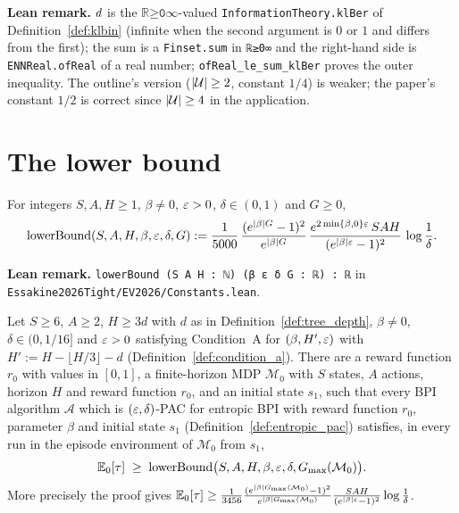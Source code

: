 \textbf{Lean remark.} $d$ is the $\texttt{ℝ≥0∞}$-valued \texttt{InformationTheory.klBer} of
Definition~\ref{def:klbin} (infinite when the second argument is $0$ or $1$ and differs from the
first); the sum is a \texttt{Finset.sum} in \texttt{ℝ≥0∞} and the
right-hand side is \texttt{ENNReal.ofReal} of a real number; \texttt{ofReal\_le\_sum\_klBer} proves
the outer inequality. The outline's version
($\lvert \mathcal U \rvert \ge 2$, constant $1/4$) is weaker; the paper's constant $1/2$ is correct
since $\lvert \mathcal U \rvert \ge 4$ in the application.

\section{The lower bound}
\label{sec:lb_theorem}

\begin{definition}\label{def:lower_bound_const}
\leanok
{}
For integers $S, A, H \ge 1$, $\beta \ne 0$, $\varepsilon > 0$, $\delta \in (0,1)$ and $G \ge 0$,
\[
  \mathrm{lowerBound}(S, A, H, \beta, \varepsilon, \delta, G) := \frac{1}{5000}\,\frac{(e^{|\beta| G} - 1)^2}{e^{|\beta| G}}\,
  \frac{e^{2\min\{\beta, 0\}\varepsilon}\, S A H}{(e^{|\beta|\varepsilon} - 1)^2}\,\log\frac1\delta .
\]
\end{definition}

\textbf{Lean remark.} \texttt{lowerBound (S A H : ℕ) (β ε δ G : ℝ) : ℝ} in
\texttt{Essakine2026Tight/EV2026/Constants.lean}.

\begin{theorem}\label{thm:lower_bound}
\leanok
{}
Let $S \ge 6$, $A \ge 2$, $H \ge 3d$ with $d$ as in Definition~\ref{def:tree_depth}, $\beta \ne 0$,
$\delta \in (0, 1/16]$ and $\varepsilon > 0$ satisfying Condition~A for $(\beta, H', \varepsilon)$ with
$H' := H - \lfloor H/3 \rfloor - d$ (Definition~\ref{def:condition_a}). There are a reward
function $r_0$ with values in $[0,1]$, a finite-horizon MDP $\mathcal M_0$ with $S$ states, $A$
actions, horizon $H$ and reward function $r_0$, and an initial state $s_1$, such that every BPI
algorithm $\mathcal A$ which is $(\varepsilon,\delta)$-PAC for entropic BPI with reward function $r_0$,
parameter $\beta$ and initial state $s_1$ (Definition~\ref{def:entropic_pac}) satisfies, in every
run in the episode environment of $\mathcal M_0$ from $s_1$,
\[
  \mathbb{E}_0[\tau] \;\ge\; \mathrm{lowerBound}\big(S, A, H, \beta, \varepsilon, \delta, G_{\max}(\mathcal M_0)\big) .
\]
More precisely the proof gives $\mathbb{E}_0[\tau] \ge \frac{1}{3456}\frac{(e^{|\beta|G_{\max}(\mathcal M_0)} - 1)^2}{e^{|\beta|G_{\max}(\mathcal M_0)}}\frac{SAH}{(e^{|\beta|\varepsilon}-1)^2}\log\frac1\delta$.
\end{theorem}

